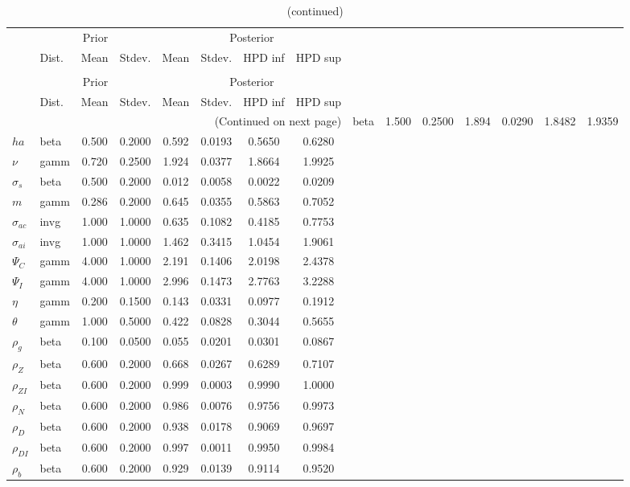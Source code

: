 
\begin{center}
\begin{longtable}{llcccccc} 
\caption{Results from Metropolis-Hastings (parameters)}
 \label{Table:MHPosterior:1}\\
\toprule 
  & \multicolumn{3}{c}{Prior}  &  \multicolumn{4}{c}{Posterior} \\
  \cmidrule(r{.75em}){2-4} \cmidrule(r{.75em}){5-8}
  & Dist. & Mean  & Stdev. & Mean & Stdev. & HPD inf & HPD sup\\
\midrule \endfirsthead 
\caption{(continued)}\\\toprule 
  & \multicolumn{3}{c}{Prior}  &  \multicolumn{4}{c}{Posterior} \\
  \cmidrule(r{.75em}){2-4} \cmidrule(r{.75em}){5-8}
  & Dist. & Mean  & Stdev. & Mean & Stdev. & HPD inf & HPD sup\\
\midrule \endhead 
\bottomrule \multicolumn{8}{r}{(Continued on next page)} \endfoot 
\bottomrule \endlastfoot 
${\gamma}$ & beta &   1.500 & 0.2500 &   1.894& 0.0290 &  1.8482 &  1.9359 \\ 
${ha}$ & beta &   0.500 & 0.2000 &   0.592& 0.0193 &  0.5650 &  0.6280 \\ 
$\nu$ & gamm &   0.720 & 0.2500 &   1.924& 0.0377 &  1.8664 &  1.9925 \\ 
$\sigma_s$ & beta &   0.500 & 0.2000 &   0.012& 0.0058 &  0.0022 &  0.0209 \\ 
${m}$ & gamm &   0.286 & 0.2000 &   0.645& 0.0355 &  0.5863 &  0.7052 \\ 
${\sigma_{ac}}$ & invg &   1.000 & 1.0000 &   0.635& 0.1082 &  0.4185 &  0.7753 \\ 
${\sigma_{ai}}$ & invg &   1.000 & 1.0000 &   1.462& 0.3415 &  1.0454 &  1.9061 \\ 
${\Psi_C}$ & gamm &   4.000 & 1.0000 &   2.191& 0.1406 &  2.0198 &  2.4378 \\ 
${\Psi_I}$ & gamm &   4.000 & 1.0000 &   2.996& 0.1473 &  2.7763 &  3.2288 \\ 
${\eta}$ & gamm &   0.200 & 0.1500 &   0.143& 0.0331 &  0.0977 &  0.1912 \\ 
${\theta}$ & gamm &   1.000 & 0.5000 &   0.422& 0.0828 &  0.3044 &  0.5655 \\ 
${\rho_g}$ & beta &   0.100 & 0.0500 &   0.055& 0.0201 &  0.0301 &  0.0867 \\ 
${\rho_Z}$ & beta &   0.600 & 0.2000 &   0.668& 0.0267 &  0.6289 &  0.7107 \\ 
${\rho_{ZI}}$ & beta &   0.600 & 0.2000 &   0.999& 0.0003 &  0.9990 &  1.0000 \\ 
${\rho_N}$ & beta &   0.600 & 0.2000 &   0.986& 0.0076 &  0.9756 &  0.9973 \\ 
${\rho_D}$ & beta &   0.600 & 0.2000 &   0.938& 0.0178 &  0.9069 &  0.9697 \\ 
${\rho_{DI}}$ & beta &   0.600 & 0.2000 &   0.997& 0.0011 &  0.9950 &  0.9984 \\ 
${\rho_b}$ & beta &   0.600 & 0.2000 &   0.929& 0.0139 &  0.9114 &  0.9520 \\ 
\end{longtable}
 \end{center}
